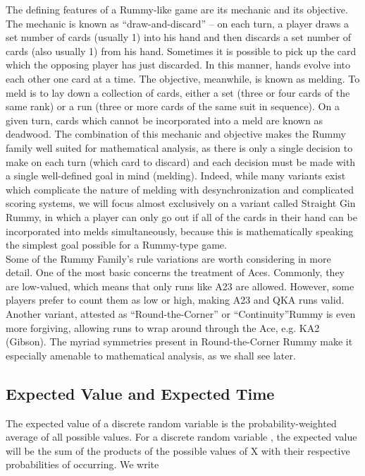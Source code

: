 \documentclass[letter,12pt]{article}
\begin{document}
The defining features of a Rummy-like game are its mechanic and its objective. The mechanic is known as “draw-and-discard” – on each turn, a player draws a set number of cards (usually 1) into his hand and then discards a set number of cards (also usually 1) from his hand. Sometimes it is possible to pick up the card which the opposing player has just discarded. In this manner, hands evolve into each other one card at a time. The objective, meanwhile, is known as melding. To meld is to lay down a collection of cards, either a set (three or four cards of the same rank) or a run (three or more cards of the same suit in sequence). On a given turn, cards which cannot be incorporated into a meld are known as deadwood. The combination of this mechanic and objective makes the Rummy family well suited for mathematical analysis, as there is only a single decision to make on each turn (which card to discard) and each decision must be made with a single well-defined goal in mind (melding). Indeed, while many variants exist which complicate the nature of melding with desynchronization and complicated scoring systems, we will focus almost exclusively on a variant called Straight Gin Rummy, in which a player can only go out if all of the cards in their hand can be incorporated into melds simultaneously, because this is mathematically speaking the simplest goal possible for a Rummy-type game.\\

Some of the Rummy Family’s rule variations are worth considering in more detail. One of the most basic concerns the treatment of Aces. Commonly, they are low-valued, which means that only runs like A23 are allowed. However, some players prefer to count them as low or high, making A23 and QKA runs valid. Another variant, attested as “Round-the-Corner” or “Continuity”Rummy is even more forgiving, allowing runs to wrap around through the Ace, e.g. KA2 (Gibson). The myriad symmetries present in Round-the-Corner Rummy make it especially amenable to mathematical analysis, as we shall see later. \\
 
\subsection{Expected Value and Expected Time}

The expected value of a discrete random variable is the probability-weighted average of all possible values. For a discrete random variable , the expected value will be the sum of the products of the possible values of X with their respective probabilities of occurring. We write\\
\end{document}
